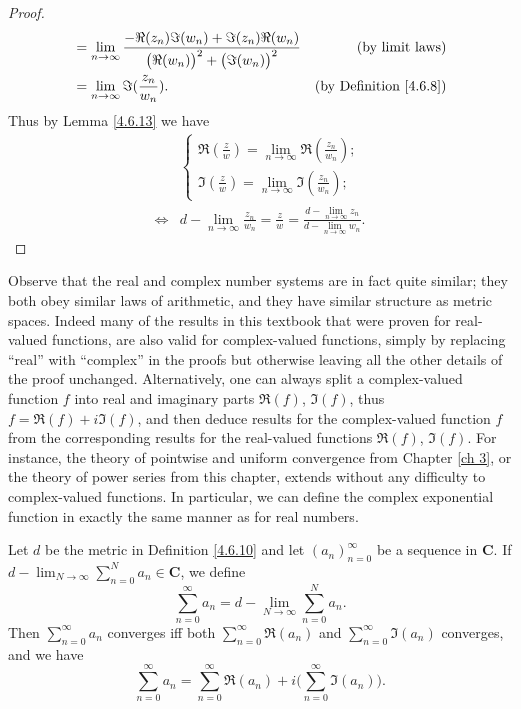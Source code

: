 \begin{proof}
\begin{align*}
                         & = \lim_{n \to \infty} \frac{- \Re(z_n) \Im(w_n) + \Im(z_n) \Re(w_n)}{\big(\Re(w_n)\big)^2 + \big(\Im(w_n)\big)^2} & \text{(by limit laws)}             \\
                         & = \lim_{n \to \infty} \Im(\frac{z_n}{w_n}).                                                                       & \text{(by Definition \ref{4.6.8})}
    \end{align*}
    Thus by Lemma \ref{4.6.13} we have
    \begin{align*}
             & \begin{cases}
            \Re(\frac{z}{w}) = \lim_{n \to \infty} \Re(\frac{z_n}{w_n}); \\
            \Im(\frac{z}{w}) = \lim_{n \to \infty} \Im(\frac{z_n}{w_n});
        \end{cases}                                                                                               \\
        \iff & d - \lim_{n \to \infty} \frac{z_n}{w_n} = \frac{z}{w} = \frac{d - \lim_{n \to \infty} z_n}{d - \lim_{n \to \infty} w_n}.
    \end{align*}
\end{proof}

\begin{note}
    Observe that the real and complex number systems are in fact quite similar;
    they both obey similar laws of arithmetic, and they have similar structure as metric spaces.
    Indeed many of the results in this textbook that were proven for real-valued functions, are also valid for complex-valued functions, simply by replacing ``real'' with ``complex'' in the proofs but otherwise leaving all the other details of the proof unchanged.
    Alternatively, one can always split a complex-valued function \(f\) into real and imaginary parts \(\Re(f)\), \(\Im(f)\), thus \(f = \Re(f) + i \Im(f)\), and then deduce results for the complex-valued function \(f\) from the corresponding results for the real-valued functions \(\Re(f)\), \(\Im(f)\).
    For instance, the theory of pointwise and uniform convergence from Chapter \ref{ch 3}, or the theory of power series from this chapter, extends without any difficulty to complex-valued functions.
    In particular, we can define the complex exponential function in exactly the same manner as for real numbers.
\end{note}

\begin{additional corollary}\label{ac 4.6.6}
Let \(d\) be the metric in Definition \ref{4.6.10} and let \((a_n)_{n = 0}^\infty\) be a sequence in \(\mathbf{C}\).
If \(d - \lim_{N \to \infty} \sum_{n = 0}^N a_n \in \mathbf{C}\), we define
\[
    \sum_{n = 0}^\infty a_n = d - \lim_{N \to \infty} \sum_{n = 0}^N a_n.
\]
Then \(\sum_{n = 0}^\infty a_n\) converges iff both \(\sum_{n = 0}^\infty \Re(a_n)\) and \(\sum_{n = 0}^\infty \Im(a_n)\) converges, and we have
\[
    \sum_{n = 0}^\infty a_n = \sum_{n = 0}^\infty \Re(a_n) + i \bigg(\sum_{n = 0}^\infty \Im(a_n)\bigg).
\]
\end{additional corollary}

